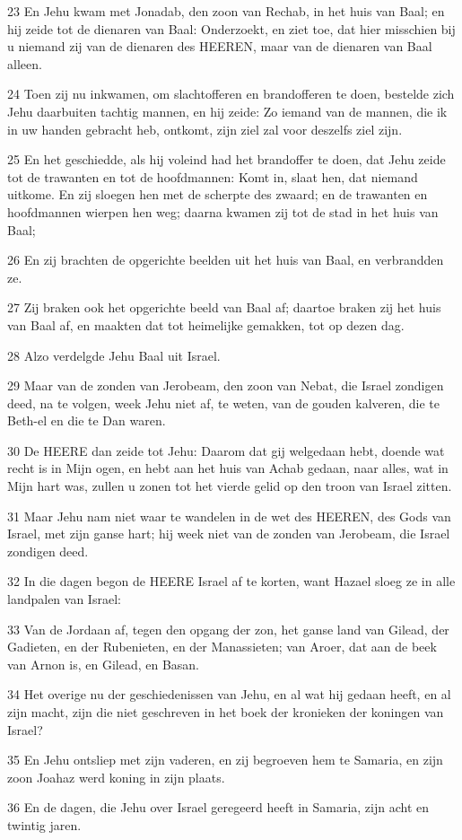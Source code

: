 \par 23 En Jehu kwam met Jonadab, den zoon van Rechab, in het huis van Baal; en hij zeide tot de dienaren van Baal: Onderzoekt, en ziet toe, dat hier misschien bij u niemand zij van de dienaren des HEEREN, maar van de dienaren van Baal alleen.
\par 24 Toen zij nu inkwamen, om slachtofferen en brandofferen te doen, bestelde zich Jehu daarbuiten tachtig mannen, en hij zeide: Zo iemand van de mannen, die ik in uw handen gebracht heb, ontkomt, zijn ziel zal voor deszelfs ziel zijn.
\par 25 En het geschiedde, als hij voleind had het brandoffer te doen, dat Jehu zeide tot de trawanten en tot de hoofdmannen: Komt in, slaat hen, dat niemand uitkome. En zij sloegen hen met de scherpte des zwaard; en de trawanten en hoofdmannen wierpen hen weg; daarna kwamen zij tot de stad in het huis van Baal;
\par 26 En zij brachten de opgerichte beelden uit het huis van Baal, en verbrandden ze.
\par 27 Zij braken ook het opgerichte beeld van Baal af; daartoe braken zij het huis van Baal af, en maakten dat tot heimelijke gemakken, tot op dezen dag.
\par 28 Alzo verdelgde Jehu Baal uit Israel.
\par 29 Maar van de zonden van Jerobeam, den zoon van Nebat, die Israel zondigen deed, na te volgen, week Jehu niet af, te weten, van de gouden kalveren, die te Beth-el en die te Dan waren.
\par 30 De HEERE dan zeide tot Jehu: Daarom dat gij welgedaan hebt, doende wat recht is in Mijn ogen, en hebt aan het huis van Achab gedaan, naar alles, wat in Mijn hart was, zullen u zonen tot het vierde gelid op den troon van Israel zitten.
\par 31 Maar Jehu nam niet waar te wandelen in de wet des HEEREN, des Gods van Israel, met zijn ganse hart; hij week niet van de zonden van Jerobeam, die Israel zondigen deed.
\par 32 In die dagen begon de HEERE Israel af te korten, want Hazael sloeg ze in alle landpalen van Israel:
\par 33 Van de Jordaan af, tegen den opgang der zon, het ganse land van Gilead, der Gadieten, en der Rubenieten, en der Manassieten; van Aroer, dat aan de beek van Arnon is, en Gilead, en Basan.
\par 34 Het overige nu der geschiedenissen van Jehu, en al wat hij gedaan heeft, en al zijn macht, zijn die niet geschreven in het boek der kronieken der koningen van Israel?
\par 35 En Jehu ontsliep met zijn vaderen, en zij begroeven hem te Samaria, en zijn zoon Joahaz werd koning in zijn plaats.
\par 36 En de dagen, die Jehu over Israel geregeerd heeft in Samaria, zijn acht en twintig jaren.

